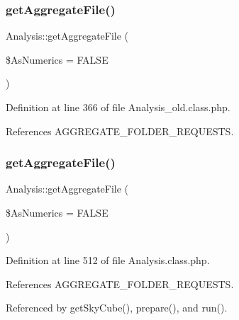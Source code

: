 \subsubsection{\texorpdfstring{get\+Aggregate\+File()}{getAggregateFile()}\hspace{0.1cm}{\footnotesize\ttfamily [1/2]}}
{\footnotesize\ttfamily Analysis\+::get\+Aggregate\+File (\begin{DoxyParamCaption}\item[{}]{\$\+As\+Numerics = {\ttfamily FALSE} }\end{DoxyParamCaption})}



Definition at line 366 of file Analysis\+\_\+old.\+class.\+php.



References A\+G\+G\+R\+E\+G\+A\+T\+E\+\_\+\+F\+O\+L\+D\+E\+R\+\_\+\+R\+E\+Q\+U\+E\+S\+TS.

\mbox{\label{class_analysis_a3a36df8e0acaa0d84d66483f395a913c}} 
\subsubsection{\texorpdfstring{get\+Aggregate\+File()}{getAggregateFile()}\hspace{0.1cm}{\footnotesize\ttfamily [2/2]}}
{\footnotesize\ttfamily Analysis\+::get\+Aggregate\+File (\begin{DoxyParamCaption}\item[{}]{\$\+As\+Numerics = {\ttfamily FALSE} }\end{DoxyParamCaption})}



Definition at line 512 of file Analysis.\+class.\+php.



References A\+G\+G\+R\+E\+G\+A\+T\+E\+\_\+\+F\+O\+L\+D\+E\+R\+\_\+\+R\+E\+Q\+U\+E\+S\+TS.



Referenced by get\+Sky\+Cube(), prepare(), and run().

